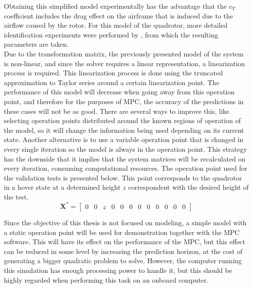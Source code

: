 Obtaining this simplified model experimentally has the advantage that the $c_T$ coefficient includes the drag effect on the airframe that is induced due to the airflow caused by the rotor. For this model of the quadrotor, more detailed identification experiments were performed by \cite{YueSun2012}, from which the resulting parameters are taken. \\

Due to the transformation matrix, the previously presented model of the system is non-linear, and since the solver requires a linear representation, a linearization process is required. This linearization process is done using the truncated approximation to Taylor series around a certain linearization point. The performance of this model will decrease when going away from this operation point, and therefore for the purposes of MPC, the accuracy of the predictions in these cases will not be as good. There are several ways to improve this, like selecting operation points distributed around the known regions of operation of the model, so it will change the information being used depending on its current state. Another alternative is to use a variable operation point that is changed in every single iteration so the model is always in the operation point. This strategy has the downside that it implies that the system matrices will be recalculated on every iteration, consuming computational resources. The operation point used for the validation tests is presented below. This point corresponds to the quadrotor in a hover state at a determined height $z$ correspondent with the desired height of the test. \\

\begin{equation*} \label{eq:operationpoint}
\mathbf{X}^* = \begin{bmatrix} 0 & 0 & z & 0 & 0 & 0 & 0 & 0 & 0 & 0 & 0 & 0 \end{bmatrix}
\end{equation*} 

Since the objective of this thesis is not focused on modeling, a simple model with a static operation point will be used for demonstration together with the MPC software. This will have its effect on the performance of the MPC, but this effect can be reduced in some level by increasing the prediction horizon, at the cost of generating a bigger quadratic problem to solve. However, the computer running this simulation has enough processing power to handle it, but this should be highly regarded when performing this task on an onboard computer.


